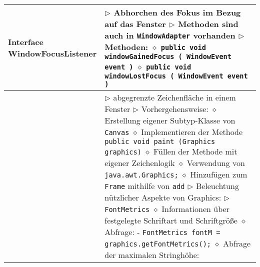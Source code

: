 \begin{longtable}{ | p{} p{} | }
	\makecell[l]{Interface \\ WindowFocusListener} & \makecell[l]{
	$\triangleright$ Abhorchen des Fokus im Bezug auf das Fenster \\
	$\triangleright$ Methoden sind auch in \texttt{WindowAdapter} vorhanden \\
	$\triangleright$ Methoden: \\
	\hspace{0.4cm} $\diamond$ \texttt{public void windowGainedFocus ( WindowEvent event )} \\
	\hspace{0.4cm} $\diamond$ \texttt{public void windowLostFocus ( WindowEvent event )} } \\ \hline

	\makecell[l]{Klasse Canvas} & \makecell[l]{
	$\triangleright$ abgegrenzte Zeichenfläche in einem Fenster \\
	$\triangleright$ Vorhergehensweise: \\
	\hspace{0.4cm} $\diamond$ Erstellung eigener Subtyp-Klasse von \texttt{Canvas} \\
	\hspace{0.4cm} $\diamond$ Implementieren der Methode \texttt{public void paint (Graphics graphics)} \\
	\hspace{0.4cm} $\diamond$ Füllen der Methode mit eigener Zeichenlogik \\
	\hspace{0.4cm} $\diamond$ Verwendung von \texttt{java.awt.Graphics;} \\
	\hspace{0.4cm} $\diamond$ Hinzufügen zum \texttt{Frame} mithilfe von \texttt{add} \\
	$\triangleright$ Beleuchtung nützlicher Aspekte von Graphics: \\
	$\triangleright$ \texttt{FontMetrics} \\
	\hspace{0.4cm} $\diamond$ Informationen über festgelegte Schriftart und Schriftgrö\ss e \\
	\hspace{0.4cm} $\diamond$ Abfrage: \\
	\hspace{0.6cm} - \texttt{FontMetrics fontM = graphics.getFontMetrics();} \\
	\hspace{0.4cm} $\diamond$ Abfrage der maximalen Stringhöhe: \\
}
\end{longtable}
